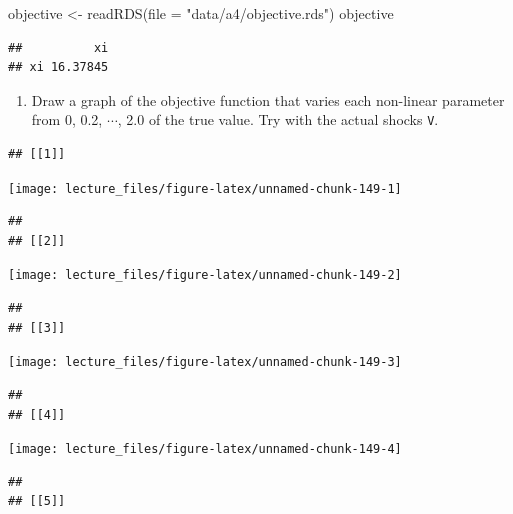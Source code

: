 \documentclass[
]{book}
\newenvironment{Shaded}{\begin{snugshade}}{\end{snugshade}}
\newcommand{\AttributeTok}[1]{\textcolor[rgb]{0.77,0.63,0.00}{#1}}
\newcommand{\FunctionTok}[1]{\textcolor[rgb]{0.00,0.00,0.00}{#1}}
\newcommand{\NormalTok}[1]{#1}
\newcommand{\OtherTok}[1]{\textcolor[rgb]{0.56,0.35,0.01}{#1}}
\newcommand{\StringTok}[1]{\textcolor[rgb]{0.31,0.60,0.02}{#1}}
\providecommand{\tightlist}{%
  \setlength{\itemsep}{0pt}\setlength{\parskip}{0pt}}
\begin{document}
\begin{Shaded}
\begin{Highlighting}[]
\NormalTok{objective }\OtherTok{\textless{}{-}} \FunctionTok{readRDS}\NormalTok{(}\AttributeTok{file =} \StringTok{"data/a4/objective.rds"}\NormalTok{)}
\NormalTok{objective}
\end{Highlighting}
\end{Shaded}

\begin{verbatim}
##          xi
## xi 16.37845
\end{verbatim}

\begin{enumerate}
\def\labelenumi{\arabic{enumi}.}
\setcounter{enumi}{11}
\tightlist
\item
  Draw a graph of the objective function that varies each non-linear parameter from 0, 0.2, \(\cdots\), 2.0 of the true value. Try with the actual shocks \texttt{V}.
\end{enumerate}

\begin{verbatim}
## [[1]]
\end{verbatim}

\begin{center}\texttt{[image: lecture\_files/figure-latex/unnamed-chunk-149-1]} \end{center}

\begin{verbatim}
## 
## [[2]]
\end{verbatim}

\begin{center}\texttt{[image: lecture\_files/figure-latex/unnamed-chunk-149-2]} \end{center}

\begin{verbatim}
## 
## [[3]]
\end{verbatim}

\begin{center}\texttt{[image: lecture\_files/figure-latex/unnamed-chunk-149-3]} \end{center}

\begin{verbatim}
## 
## [[4]]
\end{verbatim}

\begin{center}\texttt{[image: lecture\_files/figure-latex/unnamed-chunk-149-4]} \end{center}

\begin{verbatim}
## 
## [[5]]
\end{verbatim}
\end{document}
